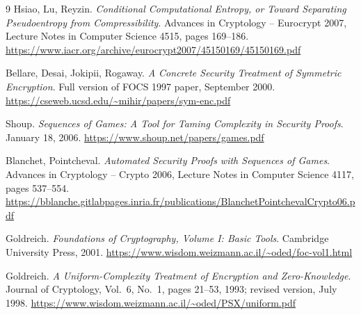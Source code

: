 \documentclass[11pt]{article}
\begin{document}
\begin{thebibliography}{9}
Hsiao, Lu, Reyzin.
\emph{Conditional Computational Entropy, or Toward Separating Pseudoentropy from Compressibility}.
Advances in Cryptology -- Eurocrypt 2007, Lecture Notes in Computer Science 4515, pages 169--186.
\url{https://www.iacr.org/archive/eurocrypt2007/45150169/45150169.pdf}

Bellare, Desai, Jokipii, Rogaway.
\emph{A Concrete Security Treatment of Symmetric Encryption}.
Full version of FOCS 1997 paper, September 2000.
\url{https://cseweb.ucsd.edu/~mihir/papers/sym-enc.pdf}

Shoup.
\emph{Sequences of Games: A Tool for Taming Complexity in Security Proofs}.
January 18, 2006.
\url{https://www.shoup.net/papers/games.pdf}

Blanchet, Pointcheval.
\emph{Automated Security Proofs with Sequences of Games}.
Advances in Cryptology -- Crypto 2006, Lecture Notes in Computer Science 4117, pages 537--554.
\url{https://bblanche.gitlabpages.inria.fr/publications/BlanchetPointchevalCrypto06.pdf}

Goldreich.
\emph{Foundations of Cryptography, Volume I: Basic Tools}.
Cambridge University Press, 2001.
\url{https://www.wisdom.weizmann.ac.il/~oded/foc-vol1.html}

Goldreich.
\emph{A Uniform-Complexity Treatment of Encryption and Zero-Knowledge}.
Journal of Cryptology, Vol.~6, No.~1, pages 21--53, 1993; revised version, July 1998.
\url{https://www.wisdom.weizmann.ac.il/~oded/PSX/uniform.pdf}

\end{thebibliography}
\end{document}
